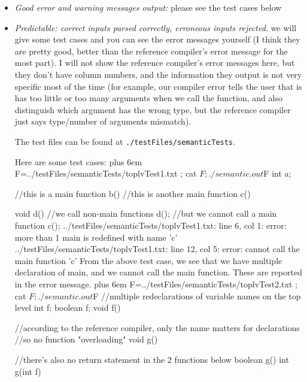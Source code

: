\documentclass{article}
\makeatletter
\newenvironment{myverb}
 {\def\@xobeysp{\ }\verbatim\rightskip=0pt plus 6em\relax}
 {\endverbatim}
\makeatother
\begin{document}
\begin{itemize}
    \item \emph{Good error and warning messages output:} please see the test cases below

    \item \emph{Predictable: correct inputs parsed correctly, erroneous inputs rejected. }
        we will give some test cases and you can see the error messages yourself (I think they are pretty good, better than the reference compiler's error message for the most part). I will not show the reference compiler's error messages here, but they don't have column numbers, and the information they output is not very specific most of the time (for example, our compiler error tells the user that is has too little or too many arguments when we call the function, and also distinguish which argument has the wrong type, but the reference compiler just says type/number of arguments mismatch).

        The test files can be found at \verb|./testFiles/semanticTests|.

        Here are some test cases:
\begin{myverb}
F=../testFiles/semanticTests/toplvTest1.txt ; cat $F; ./semantic.out $F
int a;

//this is a main function
b(){}
//this is another main function
c(){}

void d(){
    //we call non-main functions
    d();
    //but we cannot call a main function
    c();
}
../testFiles/semanticTests/toplvTest1.txt: line 6, col 1: error: more than 1 main is redefined with name 'c'
../testFiles/semanticTests/toplvTest1.txt: line 12, col 5: error: cannot call the main function 'c'
\end{myverb}
From the above test case, we see that we have multiple declaration of main, and we cannot call the main function. These are reported in the error message.
\begin{myverb}
F=../testFiles/semanticTests/toplvTest2.txt ; cat $F; ./semantic.out $F
//multiple redeclarations of variable names on the top level
int f;
boolean f;
void f(){}

//according to the reference compiler, only the name matters for declarations
//so no function "overloading"
void g(){}

//there's also no return statement in the 2 functions below
boolean g(){}
int g(int f){}


\end{myverb}
\end{itemize}
\end{document}

